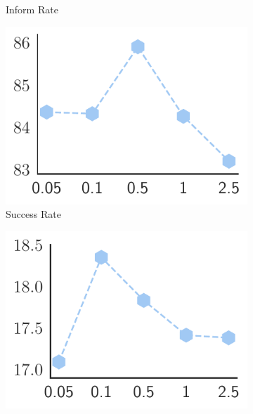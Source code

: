 \begin{figure}[tb]
\begin{subfigure}[b]{0.24\textwidth}
         \vspace{-6mm}
         \caption{\footnotesize{Inform Rate}}
         \label{fig:vary_alpha_inform}
     \end{subfigure}
     \hfill
    \begin{subfigure}[b]{0.24\textwidth}
         \centering
         \includegraphics[width=\textwidth]{./Tex/fig/success_alpha_line.pdf}
         \captionsetup{font=small}
         \vspace{-6mm}
         \caption{\footnotesize{Success Rate}}
         \label{fig:vary_alpha_success}
     \end{subfigure}
     \hfill
     \begin{subfigure}[b]{0.24\textwidth}
         \centering
         \includegraphics[width=\textwidth]{./Tex/fig/bleu_alpha_line.pdf}

\end{subfigure}
\end{figure}
